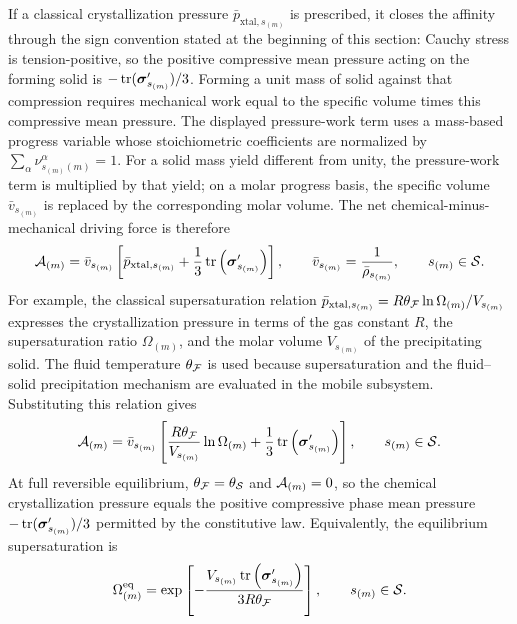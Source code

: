 If a classical crystallization pressure
\(\bar p_{\text{xtal},s_{(m)}}\) is prescribed, it closes the affinity through
the sign convention stated at the beginning of this section: Cauchy stress is
tension-positive, so the positive compressive mean pressure acting on the
forming solid is
\(-\operatorname{tr}(\boldsymbol{\sigma}_{s_{(m)}}')/3\).  Forming a unit mass of solid
against that compression requires mechanical work equal to the specific volume
times this compressive mean pressure.  The displayed pressure-work term uses a
mass-based progress variable whose stoichiometric coefficients are normalized
by
\(\sum_\alpha\nu_{s_{(m)} (m)}^\alpha=1\).  For a solid mass yield different
from unity, the pressure-work term is multiplied by that yield; on a molar
progress basis, the specific volume \(\bar v_{s_{(m)}}\) is replaced by the
corresponding molar volume.  The net chemical-minus-mechanical driving force
is therefore
%
\begin{equation}
	\mathcal{A}_{(m)}
	=
	\bar v_{s_{(m)}}
	\left[
		\bar p_{\text{xtal},s_{(m)}}
		+\frac{1}{3}
		\operatorname{tr}
		\left(
		\boldsymbol{\sigma}_{s_{(m)}}'
	\right)
	\right],
	\qquad
	\bar v_{s_{(m)}}=\frac{1}{\bar\rho_{s_{(m)}}},
	\qquad
	s_{(m)}\in\mathcal{S} .
	\label{eq:MC_crystallization_affinity_volumetric}
\end{equation}
%
For example, the classical supersaturation relation
\(\bar p_{\text{xtal},s_{(m)}}=R\theta_{\mathcal{F}}\ln\Omega_{(m)}/V_{s_{(m)}}\)
expresses the crystallization pressure in terms of the gas constant \(R\), the
supersaturation ratio \(\Omega_{(m)}\), and the molar volume \(V_{s_{(m)}}\)
of the precipitating solid.  The fluid temperature \(\theta_{\mathcal{F}}\) is used
because supersaturation and the fluid--solid precipitation mechanism are
evaluated in the mobile subsystem.  Substituting this relation gives
%
\begin{equation}
	\mathcal{A}_{(m)}
	=
	\bar v_{s_{(m)}}
		\left[
			\frac{R\theta_{\mathcal{F}}}{V_{s_{(m)}}}
			\ln\Omega_{(m)}
			+\frac{1}{3}
			\operatorname{tr}
			\left(
			\boldsymbol{\sigma}_{s_{(m)}}'
		\right)
		\right],
	\qquad
	s_{(m)}\in\mathcal{S} .
	\label{eq:MC_crystallization_supersaturation_affinity}
\end{equation}
%
At full reversible equilibrium,
\(\theta_{\mathcal{F}}=\theta_{\mathcal{S}}\) and \(\mathcal{A}_{(m)}=0\), so the chemical
crystallization pressure equals the positive compressive phase mean pressure
\(-\operatorname{tr}(\boldsymbol{\sigma}_{s_{(m)}}')/3\) permitted by the constitutive
law.  Equivalently, the equilibrium supersaturation is
%
\begin{equation}
	\Omega_{(m)}^{\rm eq}
	=
	\exp\left[
	-\frac{
		V_{s_{(m)}}
		\operatorname{tr}
		\left(
		\boldsymbol{\sigma}_{s_{(m)}}'
		\right)
	}{
		3R\theta_{\mathcal{F}}
	}
	\right],
	\qquad
	s_{(m)}\in\mathcal{S} .
	\label{eq:MC_crystallization_equilibrium_supersaturation}
\end{equation}
